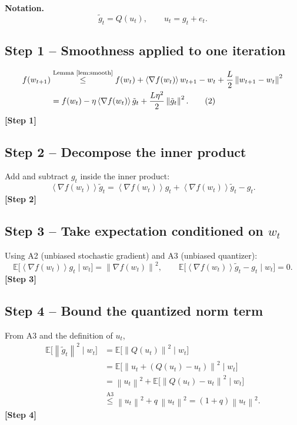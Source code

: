 \documentclass{article}
\newcommand{\E}{\mathbb{E}}
\newcommand{\norm}[1]{\left\|#1\right\|}
\newcommand{\inner}[1]{\left\langle #1 \right\rangle}
\begin{document}
\noindent\textbf{Notation.} 
\[
\tilde g_{t}=Q(u_{t}),\qquad u_{t}=g_{t}+e_{t}.
\]

\subsection*{Step 1 – Smoothness applied to one iteration}
\begin{align}
f(w_{t+1}) 
&\overset{\text{Lemma~\ref{lem:smooth}}}{\le}
f(w_{t})+\inner{\nabla f(w_{t})}{w_{t+1}-w_{t}}+\frac{L}{2}\norm{w_{t+1}-w_{t}}^{2}\nonumber\\
&= f(w_{t})-\eta\inner{\nabla f(w_{t})}{\tilde g_{t}}+\frac{L\eta^{2}}{2}\norm{\tilde g_{t}}^{2}.
\tag{2}\label{eq:smooth}
\end{align}
\noindent\textbf{[Step 1]}

\subsection*{Step 2 – Decompose the inner product}
Add and subtract $g_{t}$ inside the inner product:
\[
\inner{\nabla f(w_{t})}{\tilde g_{t}}
= \inner{\nabla f(w_{t})}{g_{t}}+\inner{\nabla f(w_{t})}{\tilde g_{t}-g_{t}}.
\tag{3}\label{eq:inner-decomp}
\]
\noindent\textbf{[Step 2]}

\subsection*{Step 3 – Take expectation conditioned on $w_{t}$}
Using A2 (unbiased stochastic gradient) and A3 (unbiased quantizer):
\[
\E\bigl[\inner{\nabla f(w_{t})}{g_{t}}\mid w_{t}\bigr]=\norm{\nabla f(w_{t})}^{2},
\qquad
\E\bigl[\inner{\nabla f(w_{t})}{\tilde g_{t}-g_{t}}\mid w_{t}\bigr]=0.
\tag{4}\label{eq:exp-inner}
\]
\noindent\textbf{[Step 3]}

\subsection*{Step 4 – Bound the quantized norm term}
From A3 and the definition of $u_{t}$,
\[
\begin{aligned}
\E\bigl[\norm{\tilde g_{t}}^{2}\mid w_{t}\bigr]
&=\E\!\bigl[\norm{Q(u_{t})}^{2}\mid w_{t}\bigr]\\
&=\E\!\bigl[\norm{u_{t}+(Q(u_{t})-u_{t})}^{2}\mid w_{t}\bigr]\\
&= \norm{u_{t}}^{2}+\E\!\bigl[\norm{Q(u_{t})-u_{t}}^{2}\mid w_{t}\bigr] \\
&\overset{\text{A3}}{\le} \norm{u_{t}}^{2}+q\,\norm{u_{t}}^{2}
= (1+q)\norm{u_{t}}^{2}.
\end{aligned}
\tag{5}\label{eq:quant-norm}
\]
\noindent\textbf{[Step 4]}
\end{document}
